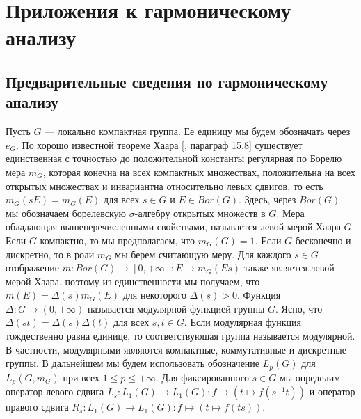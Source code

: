 \section{Приложения к гармоническому 
    анализу}\label{SectionApplicationsToHarmonicAnalysis}



\subsection{Предварительные сведения по гармоническому 
    анализу}\label{SubSectionPreliminariesOnHarmonicAnalysis}

Пусть $G$ --- локально компактная группа. Ее единицу мы будем обозначать через
$e_G$. По хорошо известной теореме Хаара [\cite{HewRossAbstrHarmAnalVol1},
параграф 15.8] существует единственная с точностью до положительной константы
регулярная по Борелю мера $m_G$, которая конечна на всех компактных множествах,
положительна на всех открытых множествах и инвариантна относительно левых
сдвигов, то есть $m_G(sE)=m_G(E)$ для всех $s\in G$ и $E\in Bor(G)$. Здесь,
через $Bor(G)$ мы обозначаем борелевскую $\sigma$-алгебру открытых множеств в
$G$. Мера обладающая вышеперечисленными свойствами, называется левой мерой Хаара
$G$. Если $G$ компактно, то мы предполагаем, что $m_G(G)=1$. Если $G$ бесконечно
и дискретно, то в роли $m_G$ мы берем считающую меру. Для каждого $s\in G$
отображение $m:Bor(G)\to[0,+\infty]:E\mapsto m_G(Es)$ также является левой мерой
Хаара, поэтому из единственности мы получаем, что $m(E)=\Delta(s)m_G(E)$ для
некоторого $\Delta(s)>0$. Функция $\Delta:G\to(0,+\infty)$ называется модулярной
функцией группы $G$. Ясно, что $\Delta(st)=\Delta(s)\Delta(t)$ для всех 
$s,t\in G$. Если модулярная функция тождественно равна единице, 
то соответствующая группа называется модулярной. 
В частности, модулярными являются компактные,
коммутативные и дискретные группы. В дальнейшем мы будем использовать
обозначение $L_p(G)$ для $L_p(G,m_G)$ при всех $1\leq p\leq+\infty$. Для
фиксированного $s\in G$ мы определим оператор левого сдвига $L_s:L_1(G)\to
L_1(G):f\mapsto(t\mapsto f(s^{-1}t))$ и оператор правого сдвига $R_s:L_1(G)\to
L_1(G):f\mapsto (t\mapsto f(ts))$. 

